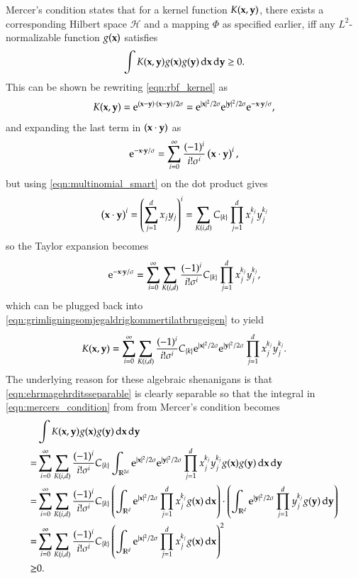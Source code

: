 Mercer's condition  states that for a kernel function $K(\mathbf{x}, \mathbf{y})$, there exists a corresponding Hilbert space $\mathcal{H}$ and a mapping $\Phi$ as specified earlier, iff any $L^2$-normalizable function $g(\mathbf{x})$ satisfies
\begin{equation}
	\int K(\mathbf{x}, \mathbf{y}) g(\mathbf{x}) g(\mathbf{y}) \operatorname{d\!}\mathbf{x} \operatorname{d\!}\mathbf{y} \ge 0. \label{eqn:mercers_condition}
\end{equation}
This can be shown be rewriting \eqref{eqn:rbf_kernel} as
\begin{equation}
	K(\mathbf{x}, \mathbf{y}) = \mathrm{e}^{(\mathbf{x}-\mathbf{y})\cdot(\mathbf{x}-\mathbf{y})/2\sigma} = \mathrm{e}^{|\mathbf{x}|^2/2\sigma} \mathrm{e}^{|\mathbf{y}|^2/2\sigma} \mathrm{e}^{-\mathbf{x}\cdot\mathbf{y}/\sigma}, \label{eqn:grimligningsomjegaldrigkommertilatbrugeigen}
\end{equation}
and expanding the last term in $(\mathbf{x}\cdot\mathbf{y})$ as
\begin{equation}
	\mathrm{e}^{-\mathbf{x}\cdot\mathbf{y}/\sigma} = \sum_{i=0}^\infty \frac{(-1)^i}{i!\sigma^i} \left( \mathbf{x}\cdot\mathbf{y} \right)^i,
\end{equation}
but using \eqref{eqn:multinomial_smart} on the dot product gives
\begin{equation}
	\left( \mathbf{x}\cdot\mathbf{y} \right)^i = \left( \sum_{j=1}^d x_j y_j \right)^i = \sum_{K(i,d)} C_{\left\{ k \right\}} \prod_{j = 1}^d x_j^{k_j} y_j^{k_j}
\end{equation}
so the Taylor expansion becomes
\begin{equation}
	\mathrm{e}^{-\mathbf{x}\cdot\mathbf{y}/\sigma} = \sum_{i=0}^\infty \sum_{K(i,d)} \frac{(-1)^i}{i!\sigma^i}  C_{\left\{ k \right\}}  \prod_{j = 1}^d x_j^{k_j} y_j^{k_j},
\end{equation}
which can be plugged back into \eqref{eqn:grimligningsomjegaldrigkommertilatbrugeigen} to yield
\begin{equation}
	K(\mathbf{x}, \mathbf{y}) = \sum_{i=0}^\infty \sum_{K(i,d)} \frac{(-1)^i}{i!\sigma^i}  C_{\left\{ k \right\}} \mathrm{e}^{|\mathbf{x}|^2/2\sigma} \mathrm{e}^{|\mathbf{y}|^2/2\sigma} \prod_{j = 1}^d x_j^{k_j} y_j^{k_j}. \label{eqn:ehrmagehrditsseparable}
\end{equation}
The underlying reason for these algebraic shenanigans is that \eqref{eqn:ehrmagehrditsseparable} is clearly separable so that the integral in \eqref{eqn:mercers_condition} from from Mercer's condition becomes
\begin{align}
	& \int K(\mathbf{x}, \mathbf{y}) g(\mathbf{x}) g(\mathbf{y}) \operatorname{d\!}\mathbf{x} \operatorname{d\!}\mathbf{y} \\
	 = & \sum_{i=0}^\infty \sum_{K(i,d)} \frac{(-1)^i}{i!\sigma^i}  C_{\left\{ k \right\}} \int_{\mathbb{R}^{2d}} \mathrm{e}^{|\mathbf{x}|^2/2\sigma} \mathrm{e}^{|\mathbf{y}|^2/2\sigma} \prod_{j = 1}^d x_j^{k_j} y_j^{k_j} g(\mathbf{x}) g(\mathbf{y}) \operatorname{d\!}\mathbf{x}\operatorname{d\!}\mathbf{y} \\
	= &\sum_{i=0}^\infty \sum_{K(i,d)} \frac{(-1)^i}{i!\sigma^i}  C_{\left\{ k \right\}} \left(\int_{\mathbb{R}^{d}} \mathrm{e}^{|\mathbf{x}|^2/2\sigma} \prod_{j = 1}^d x_j^{k_j} g(\mathbf{x}) \operatorname{d\!}\mathbf{x} \right)\cdot
	  \left(\int_{\mathbb{R}^{d}} \mathrm{e}^{|\mathbf{y}|^2/2\sigma} \prod_{j = 1}^d y_j^{k_j} g(\mathbf{y}) \operatorname{d\!}\mathbf{y} \right) \\
	= &\sum_{i=0}^\infty \sum_{K(i,d)} \frac{(-1)^i}{i!\sigma^i}  C_{\left\{ k \right\}} \left(\int_{\mathbb{R}^{d}} \mathrm{e}^{|\mathbf{x}|^2/2\sigma} \prod_{j = 1}^d x_j^{k_j} g(\mathbf{x}) \operatorname{d\!}\mathbf{x} \right)^2 \\
	\ge & 0.
\end{align}
